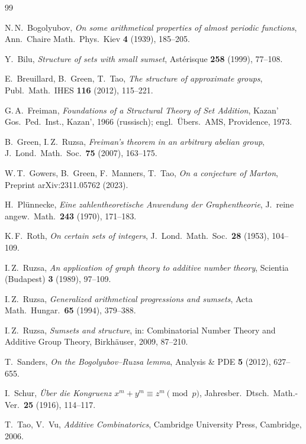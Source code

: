 \documentclass[12pt,a4paper]{amsart}
\theoremstyle{definition}
\theoremstyle{remark}
\begin{document}
\begin{thebibliography}{99}

N.\,N.~Bogolyubov,
\textit{On some arithmetical properties of almost periodic functions},
Ann.\ Chaire Math.\ Phys.\ Kiev \textbf{4} (1939), 185--205.

Y.~Bilu,
\textit{Structure of sets with small sumset},
Ast\'erisque \textbf{258} (1999), 77--108.

E.~Breuillard, B.~Green, T.~Tao,
\textit{The structure of approximate groups},
Publ.\ Math.\ IHES \textbf{116} (2012), 115--221.

G.\,A.~Freiman,
\textit{Foundations of a Structural Theory of Set Addition},
Kazan' Gos.\ Ped.\ Inst., Kazan', 1966 (russisch);
engl.\ Übers.\ AMS, Providence, 1973.

B.~Green, I.\,Z.~Ruzsa,
\textit{Freiman's theorem in an arbitrary abelian group},
J.\ Lond.\ Math.\ Soc.\ \textbf{75} (2007), 163--175.

W.\,T.~Gowers, B.~Green, F.~Manners, T.~Tao,
\textit{On a conjecture of Marton},
Preprint arXiv:2311.05762 (2023).

H.~Pl\"unnecke,
\textit{Eine zahlentheoretische Anwendung der Graphentheorie},
J.\ reine angew.\ Math.\ \textbf{243} (1970), 171--183.

K.\,F.~Roth,
\textit{On certain sets of integers},
J.\ Lond.\ Math.\ Soc.\ \textbf{28} (1953), 104--109.

I.\,Z.~Ruzsa,
\textit{An application of graph theory to additive number theory},
Scientia (Budapest) \textbf{3} (1989), 97--109.

I.\,Z.~Ruzsa,
\textit{Generalized arithmetical progressions and sumsets},
Acta Math.\ Hungar.\ \textbf{65} (1994), 379--388.

I.\,Z.~Ruzsa,
\textit{Sumsets and structure},
in: Combinatorial Number Theory and Additive Group Theory,
Birkh\"auser, 2009, 87--210.

T.~Sanders,
\textit{On the Bogolyubov--Ruzsa lemma},
Analysis \& PDE \textbf{5} (2012), 627--655.

I.~Schur,
\textit{\"Uber die Kongruenz $x^m + y^m \equiv z^m \pmod{p}$},
Jahresber.\ Dtsch.\ Math.-Ver.\ \textbf{25} (1916), 114--117.

T.~Tao, V.~Vu,
\textit{Additive Combinatorics},
Cambridge University Press, Cambridge, 2006.

\end{thebibliography}
\end{document}
